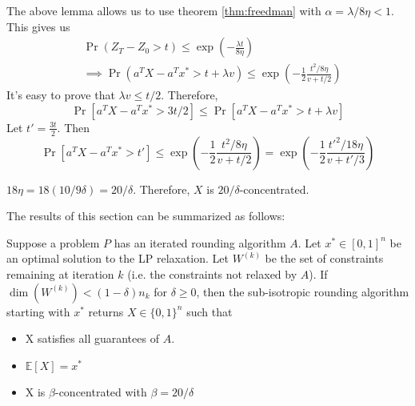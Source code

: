 The above lemma allows us to use theorem \ref{thm:freedman}
with $\alpha = \lambda/8\eta < 1$. This gives us
\begin{align*}
& \Pr(Z_T - Z_0 > t) \le \exp\left(-\frac{\lambda t}{8\eta} \right)
\\ &\implies \Pr(a^TX - a^Tx^* > t + \lambda v)
\le \exp\left(-\frac{1}{2} \frac{t^2/8\eta}{v + t/2} \right)
\end{align*}
It's easy to prove that $\lambda v \le t/2$. Therefore,
\[ \Pr[a^TX - a^Tx^* > 3t/2] \le \Pr[a^TX - a^Tx^* > t + \lambda v] \]
Let $t' = \frac{3t}{2}$. Then
\[ \Pr[a^TX - a^Tx^* > t']
\le \exp\left(-\frac{1}{2} \frac{t^2/8\eta}{v + t/2} \right)
= \exp\left(-\frac{1}{2} \frac{{t'}^2/18\eta}{v + t'/3} \right) \]

$18\eta = 18(10/9\delta) = 20/\delta$. Therefore, $X$ is $20/\delta$-concentrated.

The results of this section can be summarized as follows:
\begin{theorem}\label{thm:sub-isotropic}
Suppose a problem $P$ has an iterated rounding algorithm $A$.
Let $x^* \in [0, 1]^n$ be an optimal solution to the LP relaxation.
Let $W^{(k)}$ be the set of constraints remaining at iteration $k$
(i.e. the constraints not relaxed by $A$).
If $\dim(W^{(k)}) < (1-\delta)n_k$ for $\delta \ge 0$,
then the sub-isotropic rounding algorithm starting with $x^*$
returns $X \in \{0,1\}^n$ such that
\begin{itemize}
    \item X satisfies all guarantees of $A$.
    \item $\mathbb{E}[X] = x^*$
    \item X is $\beta$-concentrated with $\beta = 20/\delta$
\end{itemize}
\end{theorem}
